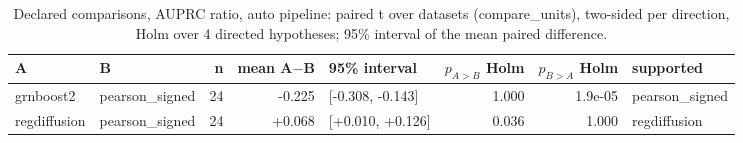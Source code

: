 \begin{table}[H]\centering\small
\caption{Declared comparisons, AUPRC ratio, auto pipeline: paired t over datasets (compare\_units), two-sided per direction, Holm over 4 directed hypotheses; 95\% interval of the mean paired difference.}
\begin{tabular}{llrrlrrl}\toprule
A & B & n & mean A$-$B & 95\% interval & $p_{A>B}$ Holm & $p_{B>A}$ Holm & supported \\ \midrule
grnboost2 & pearson\_signed & 24 & -0.225 & [-0.308, -0.143] & 1.000 & 1.9e-05 & pearson\_signed \\
regdiffusion & pearson\_signed & 24 & +0.068 & [+0.010, +0.126] & 0.036 & 1.000 & regdiffusion \\
\bottomrule\end{tabular}\end{table}
